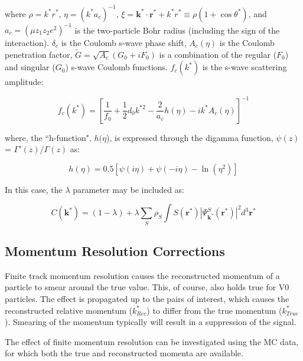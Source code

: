\documentclass[ALICE,manyauthors]{cernphprep}
\begin{document}
where $\rho = k^{*}r^{*}$, $\eta = (k^{*}a_{c})^{-1}$, $\xi = \mathbf{k^{*}} \cdot \mathbf{r^{*}} + k^{*}r^{*} \equiv \rho(1+\cos\theta^{*})$, and $a_{c} = (\mu z_{1}z_{2}e^{2})^{-1}$ is the two-particle Bohr radius (including the sign of the interaction).  $\delta_{c}$ is the Coulomb s-wave phase shift, $A_{c}(\eta)$ is the Coulomb penetration factor, $\tilde{G} = \sqrt{A_{c}}(G_{0} + iF_{0})$ is a combination of the regular ($F_{0}$) and singular ($G_{0}$) s-wave Coulomb functions.  $f_{c}(k^{*})$ is the s-wave scattering amplitude:

\begin{equation}
 f_{c}(k^{*}) = [\frac{1}{f_{0}} + \frac{1}{2}d_{0}k^{*2} - \frac{2}{a_{c}}h(\eta) - ik^{*}A_{c}(\eta)]^{-1}
\label{eqn:CoulombScattAmp}
\end{equation}

where, the ``h-function", $h(\eta$), is expressed through the digamma function, $\psi(z)$ = $\Gamma'(z)/\Gamma(z)$ as:

\begin{equation}
 h(\eta) = 0.5[\psi(i\eta) + \psi(-i\eta) - \ln(\eta^{2})]
\label{eqn:LednickyHFunction}
\end{equation} 

In this case, the $\lambda$ parameter may be included as: 

\begin{equation}
 C(\mathbf{k^{*}}) = (1 - \lambda) + \lambda\sum\limits_{S}\rho_{S}\int S(\mathbf{r^{*}})|\Psi^{S}_{\mathbf{k^{*}}}(\mathbf{r^{*}})|^{2}d^{3}\mathbf{r^{*}}
\label{eqn:GenCfEqnwLambda}
\end{equation}


\subsection{Momentum Resolution Corrections}
\label{MomentumResolutionCorrections}

Finite track momentum resolution causes the reconstructed momentum of a particle to smear around the true value.
This, of course, also holds true for V0 particles.
The effect is propagated up to the pairs of interest, which causes the reconstructed relative momentum ($k^{*}_{Rec}$) to differ from the true momentum ($k^{*}_{True}$).
Smearing of the momentum typically will result in a suppression of the signal.

The effect of finite momentum resolution can be investigated using the MC data, for which both the true and reconstructed momenta are available.
\end{document}
